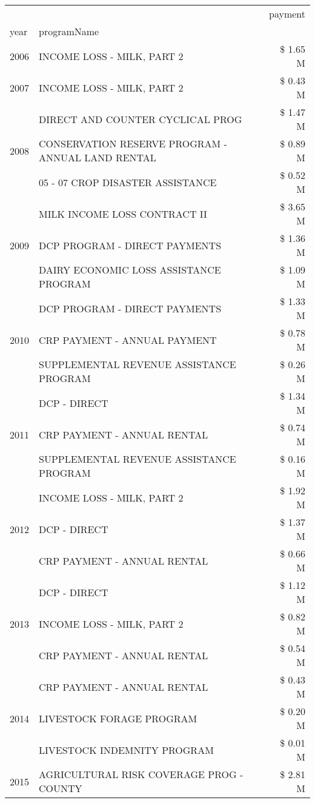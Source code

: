 \begin{tabular}{llr}
\toprule
 &  & payment \\
year & programName &  \\
\midrule
2006 & INCOME LOSS - MILK, PART 2 & \$ 1.65 M \\
\cline{1-3}
2007 & INCOME LOSS - MILK, PART 2 & \$ 0.43 M \\
\cline{1-3}
\multirow[t]{3}{*}{2008} & DIRECT AND COUNTER CYCLICAL PROG & \$ 1.47 M \\
 & CONSERVATION RESERVE PROGRAM - ANNUAL LAND RENTAL & \$ 0.89 M \\
 & 05 - 07 CROP DISASTER ASSISTANCE & \$ 0.52 M \\
\cline{1-3}
\multirow[t]{3}{*}{2009} & MILK INCOME LOSS CONTRACT II & \$ 3.65 M \\
 & DCP PROGRAM - DIRECT PAYMENTS & \$ 1.36 M \\
 & DAIRY ECONOMIC LOSS ASSISTANCE PROGRAM & \$ 1.09 M \\
\cline{1-3}
\multirow[t]{3}{*}{2010} & DCP PROGRAM - DIRECT PAYMENTS & \$ 1.33 M \\
 & CRP PAYMENT - ANNUAL PAYMENT & \$ 0.78 M \\
 & SUPPLEMENTAL REVENUE ASSISTANCE PROGRAM & \$ 0.26 M \\
\cline{1-3}
\multirow[t]{3}{*}{2011} & DCP - DIRECT & \$ 1.34 M \\
 & CRP PAYMENT - ANNUAL RENTAL & \$ 0.74 M \\
 & SUPPLEMENTAL REVENUE ASSISTANCE PROGRAM & \$ 0.16 M \\
\cline{1-3}
\multirow[t]{3}{*}{2012} & INCOME LOSS - MILK, PART 2 & \$ 1.92 M \\
 & DCP - DIRECT & \$ 1.37 M \\
 & CRP PAYMENT - ANNUAL RENTAL & \$ 0.66 M \\
\cline{1-3}
\multirow[t]{3}{*}{2013} & DCP - DIRECT & \$ 1.12 M \\
 & INCOME LOSS - MILK, PART 2 & \$ 0.82 M \\
 & CRP PAYMENT - ANNUAL RENTAL & \$ 0.54 M \\
\cline{1-3}
\multirow[t]{3}{*}{2014} & CRP PAYMENT - ANNUAL RENTAL & \$ 0.43 M \\
 & LIVESTOCK FORAGE PROGRAM & \$ 0.20 M \\
 & LIVESTOCK INDEMNITY PROGRAM & \$ 0.01 M \\
\cline{1-3}
\multirow[t]{3}{*}{2015} & AGRICULTURAL RISK COVERAGE PROG - COUNTY & \$ 2.81 M \\

\end{tabular}
